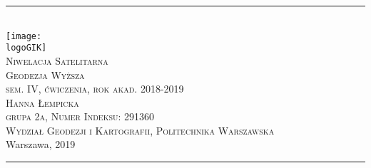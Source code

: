 \documentclass[10pt,a4paper]{article}
\newcommand{\logoGIK}{WGiK-znak.png}
\newcommand{\authorName}{Hanna Łempicka  \\ grupa 2a, Numer Indeksu: 291360}
\newcommand{\titeReport}{Niwelacja Satelitarna} %
\newcommand{\titleLecture}{Geodezja Wyższa \\ sem. IV, ćwiczenia, rok akad. 2018-2019} %
\newcommand{\faculty}{Wydział Geodezji i Kartografii}
\newcommand{\university}{Politechnika Warszawska}
\newcommand{\city}{Warszawa}
\newcommand{\thisyear}{2019}
\begin{document}
	\begin{center} 
		\rule{\textwidth}{.5pt} \\
		\vspace{1.0cm}
		\texttt{[image: \\logoGIK]}
		\vspace{0.5cm} \\
		\Large \textsc{\titeReport}
		\vspace{0.5cm} \\  
		\large \textsc{\titleLecture}
		\vspace{0.5cm}\\
		\textsc{\authorName}  \\
		\textsc{\faculty}, \textsc{\university}  \\ 
		\city, \thisyear
	\end{center} 
	\rule{\textwidth}{1.5pt}
	
	\tableofcontents 								%

\newpage
\end{document}
